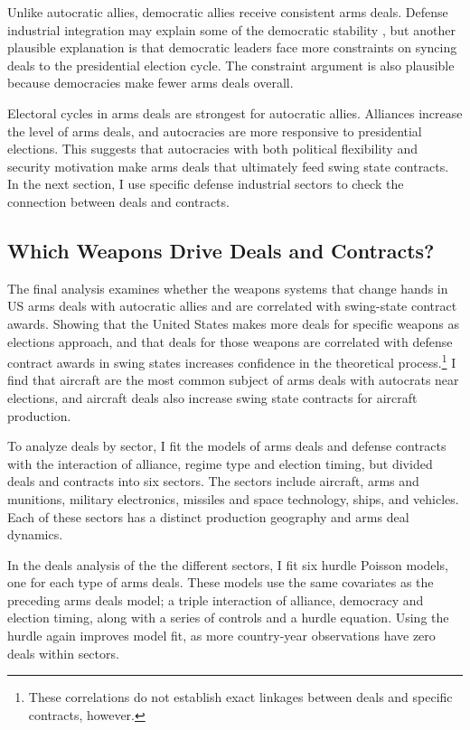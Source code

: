 \documentclass[12pt]{article}
\begin{document}
Unlike autocratic allies, democratic allies receive consistent arms deals. 
Defense industrial integration may explain some of the democratic stability \citep{Brooks2005}, but another plausible explanation is that democratic leaders face more constraints on syncing deals to the presidential election cycle.
The constraint argument is also plausible because democracies make fewer arms deals overall. 


Electoral cycles in arms deals are strongest for autocratic allies. 
Alliances increase the level of arms deals, and autocracies are more responsive to presidential elections. 
This suggests that autocracies with both political flexibility and security motivation make arms deals that ultimately feed swing state contracts. 
In the next section, I use specific defense industrial sectors to check the connection between deals and contracts. 



\subsection{Which Weapons Drive Deals and Contracts?} 


The final analysis examines whether the weapons systems that change hands in US arms deals with autocratic allies and are correlated with swing-state contract awards. 
Showing that the United States makes more deals for specific weapons as elections approach, and that deals for those weapons are correlated with defense contract awards in swing states increases confidence in the theoretical process.\footnote{These correlations do not establish exact linkages between deals and specific contracts, however.}
I find that aircraft are the most common subject of arms deals with autocrats near elections, and aircraft deals also increase swing state contracts for aircraft production.


To analyze deals by sector, I fit the models of arms deals and defense contracts with the interaction of alliance, regime type and election timing, but divided deals and contracts into six sectors. 
The sectors include aircraft, arms and munitions, military electronics, missiles and space technology, ships, and vehicles.  
Each of these sectors has a distinct production geography and arms deal dynamics.


In the deals analysis of the the different sectors, I fit six hurdle Poisson models, one for each type of arms deals. 
These models use the same covariates as the preceding arms deals model; a triple interaction of alliance, democracy and election timing, along with a series of controls and a hurdle equation.
Using the hurdle again improves model fit, as more country-year observations have zero deals within sectors. 
\end{document}

